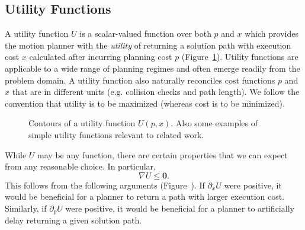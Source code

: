 \subsection{Utility Functions}
\label{subsec:utility-functions}

A utility function $U$ is a scalar-valued function
over both $p$ and $x$
which provides the motion planner with
the \emph{utility} of returning a
solution path with execution cost $x$ calculated after
incurring planning cost $p$
(Figure~\ref{fig:utility-contours}).
Utility functions are applicable to a wide range of planning regimes
and often emerge readily from the problem domain.
A utility function also naturally reconciles cost functions
$p$ and $x$ that are in different units
(e.g. collision checks and path length).
We follow the convention that utility is to be maximized
(whereas cost is to be minimized).

\begin{figure}
   \centering
   \quad%
   
   \quad%
   \quad%
   \caption{Contours of a utility function $U(p,x)$.
      Also some examples of simple utility functions
      relevant to related work.}
   \label{fig:utility-contours}
\end{figure}

While $U$ may be any function,
there are certain properties that we can expect from any reasonable
choice.
In particular,
\begin{equation}
   \nabla U \leq \mathbf{0}.
\end{equation}
This follows from the following arguments
(Figure~).
If $\partial_x U$ were positive,
it would be beneficial for a planner to return a path with larger
execution cost.
Similarly,
if $\partial_p U$ were positive,
it would be beneficial for a planner to artificially delay returning
a given solution path.


